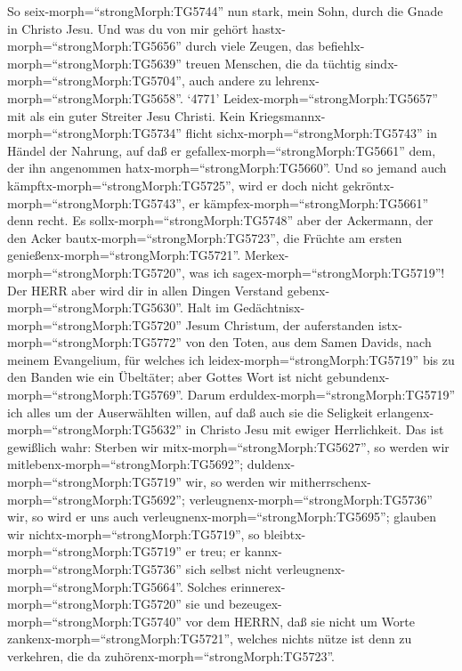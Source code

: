  So seix-morph=``strongMorph:TG5744'' nun stark, mein Sohn,
durch die Gnade in Christo Jesu.  Und was du von mir gehört
hastx-morph=``strongMorph:TG5656'' durch viele Zeugen, das
befiehlx-morph=``strongMorph:TG5639'' treuen Menschen, die da tüchtig
sindx-morph=``strongMorph:TG5704'', auch andere zu
lehrenx-morph=``strongMorph:TG5658''.  `4771'
Leidex-morph=``strongMorph:TG5657'' mit als ein guter Streiter Jesu
Christi.  Kein Kriegsmannx-morph=``strongMorph:TG5734''
flicht sichx-morph=``strongMorph:TG5743'' in Händel der Nahrung, auf daß
er gefallex-morph=``strongMorph:TG5661'' dem, der ihn angenommen
hatx-morph=``strongMorph:TG5660''.  Und so jemand auch
kämpftx-morph=``strongMorph:TG5725'', wird er doch nicht
gekröntx-morph=``strongMorph:TG5743'', er
kämpfex-morph=``strongMorph:TG5661'' denn recht.  Es
sollx-morph=``strongMorph:TG5748'' aber der Ackermann, der den Acker
bautx-morph=``strongMorph:TG5723'', die Früchte am ersten
genießenx-morph=``strongMorph:TG5721''.
Merkex-morph=``strongMorph:TG5720'', was ich
sagex-morph=``strongMorph:TG5719''!  Der HERR aber wird dir
in allen Dingen Verstand gebenx-morph=``strongMorph:TG5630''.
 Halt im Gedächtnisx-morph=``strongMorph:TG5720'' Jesum
Christum, der auferstanden istx-morph=``strongMorph:TG5772'' von den
Toten, aus dem Samen Davids, nach meinem Evangelium,  für
welches ich leidex-morph=``strongMorph:TG5719'' bis zu den Banden wie
ein Übeltäter; aber Gottes Wort ist nicht
gebundenx-morph=``strongMorph:TG5769''.  Darum
erduldex-morph=``strongMorph:TG5719'' ich alles um der Auserwählten
willen, auf daß auch sie die Seligkeit
erlangenx-morph=``strongMorph:TG5632'' in Christo Jesu mit ewiger
Herrlichkeit.  Das ist gewißlich wahr: Sterben wir
mitx-morph=``strongMorph:TG5627'', so werden wir
mitlebenx-morph=``strongMorph:TG5692''; 
duldenx-morph=``strongMorph:TG5719'' wir, so werden wir
mitherrschenx-morph=``strongMorph:TG5692'';
verleugnenx-morph=``strongMorph:TG5736'' wir, so wird er uns auch
verleugnenx-morph=``strongMorph:TG5695'';  glauben wir
nichtx-morph=``strongMorph:TG5719'', so
bleibtx-morph=``strongMorph:TG5719'' er treu; er
kannx-morph=``strongMorph:TG5736'' sich selbst nicht
verleugnenx-morph=``strongMorph:TG5664''.  Solches
erinnerex-morph=``strongMorph:TG5720'' sie und
bezeugex-morph=``strongMorph:TG5740'' vor dem HERRN, daß sie nicht um
Worte zankenx-morph=``strongMorph:TG5721'', welches nichts nütze ist
denn zu verkehren, die da zuhörenx-morph=``strongMorph:TG5723''.
